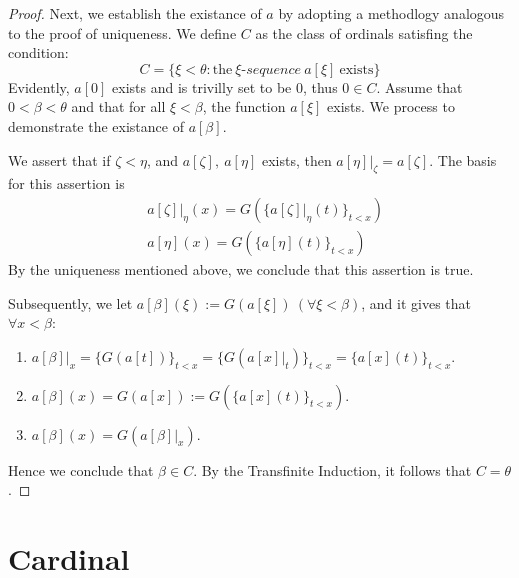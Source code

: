 \begin{proof}
  Next, we establish the existance of $a$ by adopting a methodlogy analogous to the proof of uniqueness. We define $C$ as the class of ordinals satisfing the condition:
  \begin{equation*}
    C = \{ \xi < \theta: \text{the}\ \xi \mbox{-} sequence \ a[\xi] \ \text{exists} \}
  \end{equation*}
  Evidently, $a[0]$ exists and is trivilly set to be $0$, thus $0 \in C$. Assume that $0 < \beta < \theta$ and that for all $\xi < \beta$, the function $a[\xi]$ exists. We process to demonstrate the existance of $a[\beta]$.

  We assert that if $\zeta < \eta$, and $a[\zeta], \ a[\eta]$ exists, then $a[\eta]|_{\zeta} = a[\zeta]$. The basis for this assertion is
  \begin{align*}
    & a[\zeta]|_{\eta}(x) = G(\{ a[\zeta]|_{\eta} (t) \}_{t < x}) \\
    & a[\eta] (x) = G(\{ a[\eta](t) \}_{t< x})
  \end{align*}
  By the uniqueness mentioned above, we conclude that this assertion is true.

  Subsequently, we let $a[\beta](\xi) := G(a[\xi]) \ (\forall \xi < \beta)$, and it gives that $\forall x < \beta$: 
  \begin{enumerate}
    \item $a[\beta]|_{x} = \{ G(a[t]) \}_{t < x} = \{ G(a[x]|_{t}) \}_{t < x} = \{ a[x](t) \}_{t < x}$.
    \item $a[\beta](x) = G(a[x]) := G(\{ a[x](t) \}_{t < x})$.
    \item $a[\beta](x) = G(a[\beta]|_{x})$.
  \end{enumerate}
  Hence we conclude that $\beta \in C$. By the Transfinite Induction, it follows that $C = \theta$.
  
\end{proof}







\section{Cardinal}


